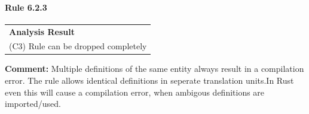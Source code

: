 \paragraph{Rule 6.2.3}
\begin{longtable}{p{13cm}}
\textbf{Analysis Result} \\
(C3) Rule can be dropped completely \\
\end{longtable}
\textbf{Comment:} Multiple definitions of the same entity always result in a compilation error. The rule allows identical definitions in seperate translation units.In Rust even this will cause a compilation error, when ambigous definitions are imported/used. \\


